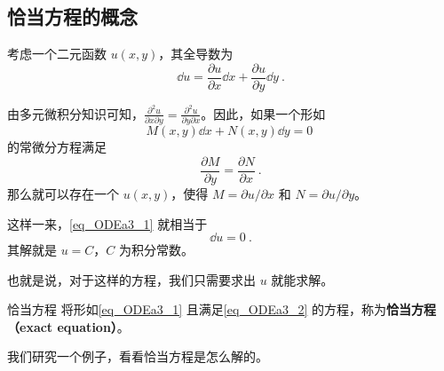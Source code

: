 

\subsection{恰当方程的概念}

考虑一个二元函数 $u(x, y)$，其全导数为
\begin{equation}
\dd u=\frac{\partial u}{\partial x}\dd x+\frac{\partial u}{\partial y}\dd y~.
\end{equation}

由多元微积分知识可知，$\frac{\partial^2 u}{\partial x\partial y}=\frac{\partial^2 u}{\partial y\partial x}$。因此，如果一个形如
\begin{equation}\label{eq_ODEa3_1}
M(x, y)\dd x+N(x, y)\dd y=0~
\end{equation}
的常微分方程满足
\begin{equation}\label{eq_ODEa3_2}
\frac{\partial M}{\partial y}=\frac{\partial N}{\partial x}~.
\end{equation}
那么就可以存在一个 $u(x, y)$，使得 $M=\partial u/\partial x$ 和 $N=\partial u/\partial y$。

这样一来，\autoref{eq_ODEa3_1} 就相当于
\begin{equation}
\dd u=0~.
\end{equation}
其解就是 $u=C$，$C$ 为积分常数。

也就是说，对于这样的方程，我们只需要求出 $u$ 就能求解。

\begin{definition}{恰当方程}
将形如\autoref{eq_ODEa3_1} 且满足\autoref{eq_ODEa3_2} 的方程，称为\textbf{恰当方程（exact equation）}。
\end{definition}

我们研究一个例子，看看恰当方程是怎么解的。

